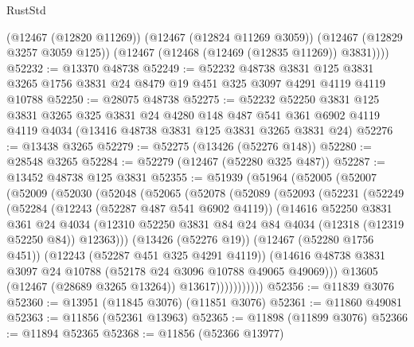 \begin{lexlean}{RustStd}
\begin{coremodule}
        (@12467 (@12820 @11269))
        (@12467 (@12824 @11269 @3059))
        (@12467 (@12829 @3257 @3059 @125))
        (@12467 (@12468 (@12469 (@12835 @11269)) @3831))))
@52232 := @13370 @48738
@52249 := @52232
    @48738
    @3831
    @125
    @3831
    @3265
    @1756
    @3831
    @24
    @8479
    @19
    @451
    @325
    @3097
    @4291
    @4119
    @4119
    @10788
@52250 := @28075 @48738
@52275 := @52232
    @52250
    @3831
    @125
    @3831
    @3265
    @325
    @3831
    @24
    @4280
    @148
    @487
    @541
    @361
    @6902
    @4119
    @4119
    @4034
    (@13416 @48738 @3831 @125 @3831 @3265 @3831 @24)
@52276 := @13438 @3265
@52279 := @52275 (@13426 (@52276 @148))
@52280 := @28548 @3265
@52284 := @52279 (@12467 (@52280 @325 @487))
@52287 := @13452 @48738 @125 @3831
@52355 := @51939
    (@51964
      (@52005
        (@52007
          (@52009
            (@52030
              (@52048
                (@52065
                  (@52078
                    (@52089
                      (@52093
                        (@52231
                          (@52249
                            (@52284
                              (@12243 (@52287 @487 @541 @6902 @4119))
                              (@14616
                                @52250
                                @3831
                                @361
                                @24
                                @4034
                                (@12310
                                  @52250
                                  @3831
                                  @84
                                  @24
                                  @84
                                  @4034
                                  (@12318 (@12319 @52250 @84))
                                  @12363)))
                            (@13426 (@52276 @19))
                            (@12467 (@52280 @1756 @451))
                            (@12243 (@52287 @451 @325 @4291 @4119))
                            (@14616
                              @48738
                              @3831
                              @3097
                              @24
                              @10788
                              (@52178 @24 @3096 @10788 @49065 @49069)))
                          @13605
                          (@12467 (@28689 @3265 @13264))
                          @13617)))))))))))
@52356 := @11839 @3076
@52360 := @13951 (@11845 @3076) (@11851 @3076)
@52361 := @11860 @49081
@52363 := @11856 (@52361 @13963)
@52365 := @11898 (@11899 @3076)
@52366 := @11894 @52365
@52368 := @11856 (@52366 @13977)

\end{coremodule}
\end{lexlean}
